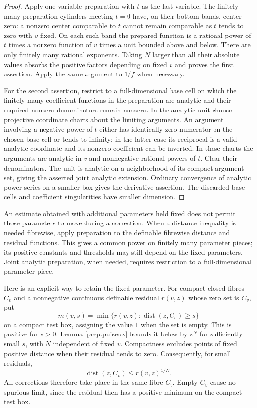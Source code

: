 \begin{proof}
Apply one-variable preparation with $t$ as the last variable. The finitely
many preparation cylinders meeting $t=0$ have, on their bottom bands,
center zero: a nonzero center comparable to $t$ cannot remain comparable
as $t$ tends to zero with $v$ fixed. On each such band the prepared
function is a rational power of $t$ times a nonzero function of $v$
times a unit bounded above and below. There are only finitely many
rational exponents. Taking $N$ larger than all their absolute values
absorbs the positive factors depending on fixed $v$ and proves the
first assertion. Apply the same argument to $1/f$ when necessary.

For the second assertion, restrict to a full-dimensional base cell on
which the finitely many coefficient functions in the preparation are
analytic and their required nonzero denominators remain nonzero.
In the analytic unit choose projective coordinate charts about the
limiting arguments. An argument involving a negative power of $t$
either has identically zero numerator on the chosen base cell or
tends to infinity; in the latter case its reciprocal is a valid
analytic coordinate and its nonzero coefficient can be inverted.
In these charts the arguments are analytic in $v$ and nonnegative
rational powers of $t$.
Clear their denominators. The unit is analytic on a neighborhood of
its compact argument set, giving the asserted joint analytic extension.
Ordinary convergence of analytic power series on a smaller box gives
the derivative assertion. The discarded base cells and coefficient
singularities have smaller dimension.
\end{proof}

\begin{remark}\label{prep:fixed-parameters}
An estimate obtained with additional parameters held fixed does not
permit those parameters to move during a correction. When a distance
inequality is needed fibrewise, apply preparation to the definable
fibrewise distance and residual functions. This gives a common power
on finitely many parameter pieces; its positive constants and thresholds
may still depend on the fixed parameters. Joint analytic preparation,
when needed, requires restriction to a full-dimensional parameter piece.

Here is an explicit way to retain the fixed parameter. For compact
closed fibres $C_v$ and a nonnegative continuous definable residual
$r(v,z)$ whose zero set is $C_v$, put
\[
 m(v,s)=\min\{r(v,z):\operatorname{dist}(z,C_v)\geq s\}
\]
on a compact test box, assigning the value $1$ when the set is empty.
This is positive for $s>0$. Lemma \ref{prep:puiseux} bounds it below
by $s^N$ for sufficiently small $s$, with $N$ independent of fixed
$v$. Compactness excludes points of fixed positive distance when
their residual tends to zero. Consequently, for small residuals,
\[
 \operatorname{dist}(z,C_v)\leq r(v,z)^{1/N}.
\]
All corrections therefore take place in the same fibre $C_v$.
Empty $C_v$ cause no spurious limit, since the residual then has
a positive minimum on the compact test box.
\end{remark}


